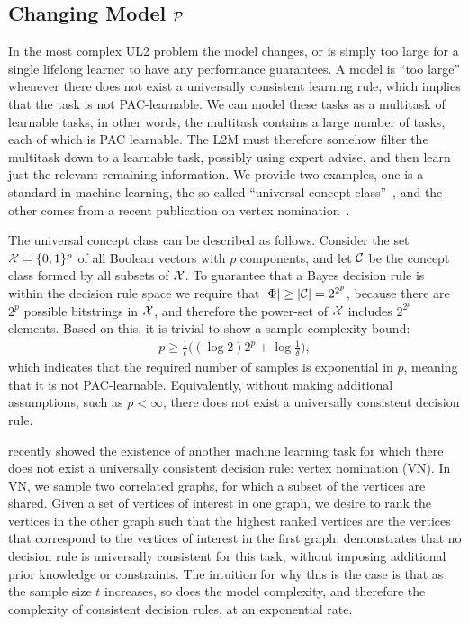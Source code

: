 \documentclass{article}
\begin{document}
\subsection{Changing Model $\mathcal{P}$}

In the most complex  UL2 problem  the model changes, or is simply too large for a single lifelong learner to have any performance guarantees. A model is ``too large'' whenever there does not exist a universally consistent learning rule, which implies that the task is not PAC-learnable. We can model these tasks as a multitask of learnable tasks, in other words, the multitask contains a large number of tasks, each of which is PAC learnable.  The L2M must therefore somehow filter the multitask down to a learnable task, possibly using expert advise, and then learn just the relevant remaining information.  We provide two examples, one is a standard in machine learning, the so-called ``universal concept class''~\cite{Mohri2012}, and the other comes from a recent publication on vertex nomination~\cite{Lyzinski2017}.  

The universal concept class can be described as follows.  Consider the set $\mathcal{X}=\{0,1\}^p$ of all Boolean vectors with $p$ components, and let $\mathcal{C}$ be the concept class formed by all subsets of $\mathcal{X}$.  To guarantee that a Bayes decision rule is within the decision rule space we require that $|\Phi| \geq |\mathcal{C}| = 2^{2^p}$, because there are $2^p$ possible bitstrings in $\mathcal{X}$, and therefore the power-set of $\mathcal{X}$ includes $2^{2^p}$ elements.  Based on this, it is trivial to show a sample complexity bound:
\begin{align}
    p \geq \frac{1}{\epsilon} \big(  (\log 2) 2^p + \log \frac{1}{\delta} \big),
\end{align}
which indicates that the required number of samples is exponential in $p$, meaning that it is not PAC-learnable.  Equivalently, without making additional assumptions, such as $p < \infty$, there does not exist a universally consistent decision rule. 

\citet{Lyzinski2017} recently showed the existence of another machine learning task for which there does not exist a universally consistent decision rule: vertex nomination (VN).  In VN, we sample two correlated graphs, for which a subset of the vertices are shared.  Given a set of vertices of interest in one graph, we desire to rank the vertices in the other graph such that the highest ranked vertices are the vertices that correspond to the vertices of interest in the first graph.  \citet{Lyzinski2017} demonstrates that no decision rule is universally consistent for this task, without imposing additional prior knowledge or constraints.   The intuition for why this is the case is that as the sample size $t$ increases, so does the model complexity, and therefore the complexity of consistent decision rules, at an exponential rate.
\end{document}
